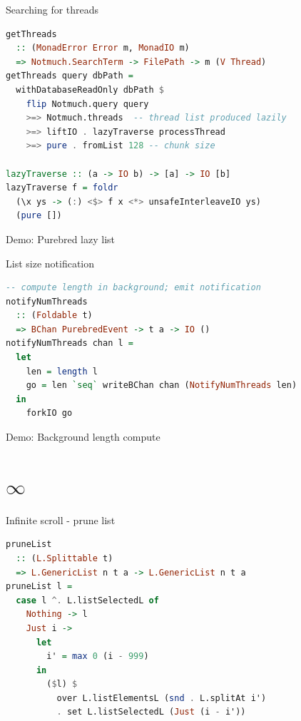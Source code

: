 \documentclass[ignorenonframetext,aspectratio=169,dvipsnames]{beamer}
\begin{document}
\begin{frame}[fragile]{Searching for threads}
\begin{lstlisting}[language=Haskell]
getThreads
  :: (MonadError Error m, MonadIO m)
  => Notmuch.SearchTerm -> FilePath -> m (V Thread)
getThreads query dbPath =
  withDatabaseReadOnly dbPath $
    flip Notmuch.query query
    >=> Notmuch.threads  -- thread list produced lazily
    >=> liftIO . lazyTraverse processThread
    >=> pure . fromList 128 -- chunk size

lazyTraverse :: (a -> IO b) -> [a] -> IO [b]
lazyTraverse f = foldr
  (\x ys -> (:) <$> f x <*> unsafeInterleaveIO ys)
  (pure [])
\end{lstlisting}
\end{frame}

\begin{frame}[plain]
\huge
  Demo: Purebred lazy list
\end{frame}

\begin{frame}[fragile]{List size notification}
\begin{lstlisting}[language=Haskell]
-- compute length in background; emit notification
notifyNumThreads
  :: (Foldable t)
  => BChan PurebredEvent -> t a -> IO ()
notifyNumThreads chan l =
  let
    len = length l
    go = len `seq` writeBChan chan (NotifyNumThreads len)
  in
    forkIO go
\end{lstlisting}
\end{frame}

\begin{frame}[plain]
\huge
  Demo: Background length compute
\end{frame}


\section{\fontsize{64pt}{64pt}\selectfont $\infty$}


\begin{frame}[fragile]{Infinite scroll - prune list}
\begin{lstlisting}[language=Haskell]
pruneList
  :: (L.Splittable t)
  => L.GenericList n t a -> L.GenericList n t a
pruneList l =
  case l ^. L.listSelectedL of
    Nothing -> l
    Just i ->
      let
        i' = max 0 (i - 999)
      in
        ($l) $
          over L.listElementsL (snd . L.splitAt i')
          . set L.listSelectedL (Just (i - i'))
\end{lstlisting}
\end{frame}
\end{document}
